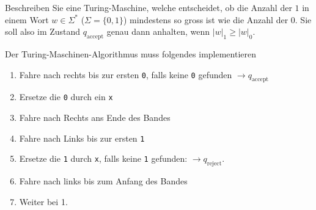 Beschreiben Sie eine Turing-Maschine, welche entscheidet, ob die
Anzahl der $1$ in einem Wort $w\in\Sigma^*$ ($\Sigma=\{0,1\}$)
mindestens so gross ist wie die Anzahl der $0$.
Sie soll also im Zustand $q_{\text{accept}}$
genau dann anhalten, wenn $|w|_1\ge |w|_0$.


\begin{loesung}
Der Turing-Maschinen-Algorithmus muss folgendes implementieren
\begin{enumerate}
\item Fahre nach rechts bis zur ersten {\tt 0}, falls keine  {\tt 0}
gefunden $\to q_{\text{accept}}$
\item Ersetze die {\tt 0} durch ein {\tt x}
\item Fahre nach Rechts ans Ende des Bandes
\item Fahre nach Links bis zur ersten {\tt 1}
\item Ersetze die {\tt 1} durch {\tt x}, falls keine {\tt 1}
gefunden: $\to q_{\text{reject}}$.
\item Fahre nach links bis zum Anfang des Bandes
\item Weiter bei 1.
\qedhere
\end{enumerate}
\end{loesung}
